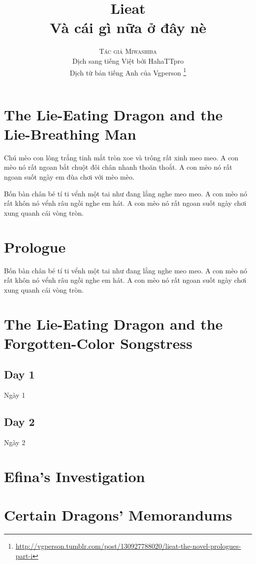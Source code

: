 \documentclass[13pt]{extarticle}
\title{\Huge \textbf{Lieat} \\ Và cái gì nữa ở đây nè }
\author{\textsc{Tác giả Miwashiba} \\ Dịch sang tiếng Việt bởi HahaTTpro \\ Dịch từ bản tiếng Anh của Vgperson \thanks{\url{http://vgperson.tumblr.com/post/130927788020/lieat-the-novel-prologues-part-i}}}
\begin{document}
	
	\maketitle
	
	\pagebreak
		
	\tableofcontents
	
	\pagebreak
	
	\section{The Lie-Eating Dragon and the Lie-Breathing Man}
	
	Chú mèo con lông trắng tinh 
	mắt tròn xoe và trông rất xinh meo meo.
	A con mèo nó rất ngoan 
	bắt chuột đôi chân nhanh thoăn thoắt.
	A con mèo nó rất ngoan 
	suốt ngày em đùa chơi với mèo mèo.
	
	Bốn bàn chân bé tí ti 
	vểnh một tai như đang lắng nghe meo meo.
	A con mèo nó rất khôn 
	nó vểnh râu ngồi nghe em hát.
	A con mèo nó rất ngoan 
	suốt ngày chơi xung quanh cái vòng tròn. \cite{meowone}
	

	
	\section{Prologue}
		Bốn bàn chân bé tí ti 
	vểnh một tai như đang lắng nghe meo meo.
	A con mèo nó rất khôn 
	nó vểnh râu ngồi nghe em hát.
	A con mèo nó rất ngoan 
	suốt ngày chơi xung quanh cái vòng tròn. 
	
	\section{The Lie-Eating Dragon and the Forgotten-Color Songstress}
	
	\subsection*{Day 1}
	Ngày 1 
	
	\subsection*{Day 2}
	Ngày 2 
	
	\section{Efina’s Investigation}
	
	\section{Certain Dragons’ Memorandums}
	
	
\end{document}
